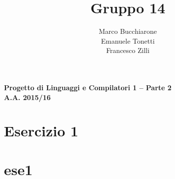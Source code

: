 \documentclass[a4paper,oneside,11pt]{article}
\makeatletter
\renewcommand\and{\\}
\renewcommand\maketitle{%
\bigskip\bigskip\bigskip\bigskip%
\begin{center}\bfseries\large%
Progetto di Linguaggi e Compilatori 1 -- Parte 2 \\ A.A. 2015/16\\%
\end{center}%
\bigskip%
\begin{center}\bfseries\LARGE \@title  \end{center}%
\bigskip%
\begin{center}\bfseries\large \@author \end{center}%
\bigskip\bigskip}
\makeatother
\begin{document}
\title{Gruppo 14}
\author{Marco Bucchiarone \and Emanuele Tonetti \and Francesco Zilli}
\maketitle
%
\section*{Esercizio 1}

\section{ese1}
\end{document}
